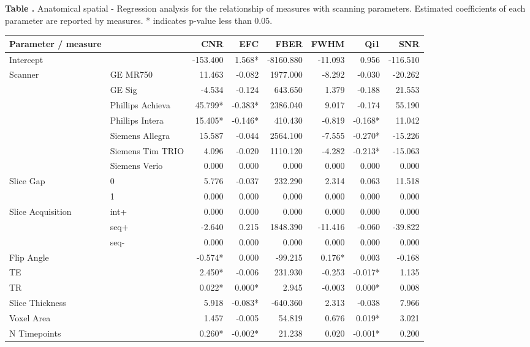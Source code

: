 \begin{table}
  \textbf{\label{anat_spat_reg} Table .}{ Anatomical spatial - Regression analysis for the relationship of measures with scanning parameters. Estimated coefficients of each parameter are reported by measures. * indicates p-value less than 0.05.  }
  \begin{center}
    \begin{tabular}{ l l r r r r r r }
    \hline
    Parameter / measure & & CNR & EFC & FBER & FWHM & Qi1 & SNR \\ \hline
    Intercept & & -153.400 & 1.568* & -8160.880 & -11.093 & 0.956 & -116.510 \\
    Scanner & GE MR750 & 11.463 & -0.082 & 1977.000 & -8.292 & -0.030 & -20.262 \\
     & GE Sig & -4.534 & -0.124 & 643.650 & 1.379 & -0.188 & 21.553 \\
     & Phillips Achieva & 45.799* & -0.383* & 2386.040 & 9.017 & -0.174 & 55.190 \\
     & Phillips Intera & 15.405* & -0.146* & 410.430 & -0.819 & -0.168* & 11.042 \\
     & Siemens Allegra & 15.587 & -0.044 & 2564.100 & -7.555 & -0.270* & -15.226 \\
     & Siemens Tim TRIO & 4.096 & -0.020 & 1110.120 & -4.282 & -0.213* & -15.063 \\
     & Siemens Verio & 0.000 & 0.000 & 0.000 & 0.000 & 0.000 & 0.000 \\
    Slice Gap & 0 & 5.776 & -0.037 & 232.290 & 2.314 & 0.063 & 11.518 \\
     & 1 & 0.000 & 0.000 & 0.000 & 0.000 & 0.000 & 0.000 \\
    Slice Acquisition & int+ & 0.000 & 0.000 & 0.000 & 0.000 & 0.000 & 0.000 \\
     & seq+ & -2.640 & 0.215 & 1848.390 & -11.416 & -0.060 & -39.822 \\
     & seq- & 0.000 & 0.000 & 0.000 & 0.000 & 0.000 & 0.000 \\
    Flip Angle & & -0.574* & 0.000 & -99.215 & 0.176* & 0.003 & -0.168 \\
    TE & & 2.450* & -0.006 & 231.930 & -0.253 & -0.017* & 1.135 \\
    TR & & 0.022* & 0.000* & 2.945 & -0.003 & 0.000* & 0.008 \\
    Slice Thickness & & 5.918 & -0.083* & -640.360 & 2.313 & -0.038 & 7.966 \\
    Voxel Area & & 1.457 & -0.005 & 54.819 & 0.676 & 0.019* & 3.021 \\
    N Timepoints & & 0.260* & -0.002* & 21.238 & 0.020 & -0.001* & 0.200 \\
    \hline
    \end{tabular}
  \end{center}
\end{table}


